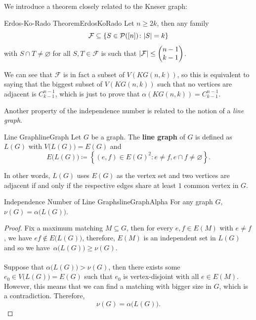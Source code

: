 \documentclass[math]{amznotes}
\theoremstyle{remark}
\begin{document}
We introduce a theorem closely related to the Kneser graph:
\begin{thmbox}{Erdos-Ko-Rado Theorem}{ErdosKoRado}
    Let $n \geq 2k$, then any family
    \begin{equation*}
        \mathcal{F} \subseteq \left\{S \in \mathcal{P}([n]) \colon {\left\lvert {S} \right\rvert} = k\right\}
    \end{equation*}
    with $S \cap T \neq \varnothing$ for all $S, T \in \mathcal{F}$ is such that ${\left\lvert {\mathcal{F}} \right\rvert} \leq \begin{pmatrix}
        n - 1 \\
        k - 1
    \end{pmatrix}$.
\end{thmbox}
We can see that $\mathcal{F}$ is in fact a subset of $V(KG(n, k))$, so this is equivalent to saying that the biggest subset of $V(KG(n, k))$ such that no vertices are adjacent is $C^{n - 1}_{k - 1}$, which is just to prove that $\alpha(KG(n, k)) = C^{n - 1}_{k - 1}$.

Another property of the independence number is related to the notion of a \textit{line graph}.
\begin{dfnbox}{Line Graph}{lineGraph}
    Let $G$ be a graph. The {\color{red} \textbf{line graph}} of $G$ is defined as $L(G)$ with $V\bigl(L(G)\bigr) = E(G)$ and
    \begin{equation*}
        E\bigl(L(G)\bigr) \coloneqq \left\{(e, f) \in E(G)^2 \colon e \neq f, e \cap f \neq \varnothing\right\}.
    \end{equation*}
\end{dfnbox}
In other words, $L(G)$ uses $E(G)$ as the vertex set and two vertices are adjacent if and only if the respective edges share at least $1$ common vertex in $G$.
\begin{probox}{Independence Number of Line Graphs}{lineGraphAlpha}
    For any graph $G$, $\nu(G) = \alpha\bigl(L(G)\bigr)$.
    \tcblower
    \begin{proof}
        Fix a maximum matching $M \subseteq G$, then for every $e, f \in E(M)$ with $e \neq f$, we have $ef \notin E\bigl(L(G)\bigr)$, therefore, $E(M)$ is an independent set in $L(G)$ and so we have~$\alpha\bigl(L(G)\bigr) \geq \nu(G)$.
        \\\\
        Suppose that $\alpha\bigl(L(G)\bigr) > \nu(G)$, then there exists some $e_0 \in V\bigl(L(G)\bigr) = E(G)$ such that $e_0$ is vertex-disjoint with all $e \in E(M)$. However, this means that we can find a matching with bigger size in $G$, which is a contradiction. Therefore, 
        \begin{equation*}
            \nu(G) = \alpha\bigl(L(G)\bigr).
        \end{equation*}
    \end{proof}
\end{probox}
\end{document}
